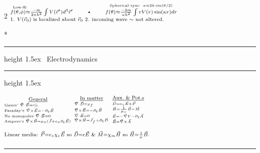 \documentclass{article}
\makeatletter
\def\HrulefillThick{\leavevmode\leaders\hrule height 1.5ex \hfill\kern\z@}
\newcommand{\YgorUD}[2]{\,\!^{#1}_{#2}}
\renewcommand{\section}[1]{%
     \@startsection{section}{1}{0mm}{0.01ex}{0.01ex}{%
         \normalfont\Large\bfseries\underline\centering }*{%
         \noindent\HrulefillThick%
              ~#1~\HrulefillThick}}
\makeatother
\begin{document}
\begin{multicols}{2}
$\YgorUD{%
        \overset{\text{Low-E:}}{%
        f ( \theta ,\phi ) \approx} \smash{\frac{-m}{2 \pi \hbar^{2}}}%
          \int   V ( \vec{r}' ) d^{ 3} \vec{r}'%
        \quad\quad\text{\textbullet}\quad\quad%
        \overset{\text{Spherical sym: }\, \kappa = 2k \sin ( \theta / 2 )}{%
        f ( \theta ) \approx\smash{\frac{- 2m}{\kappa \hbar^{2}}}%
          \int   r V ( r )  \sin ( \kappa r ) dr}%
    }{%
        \text{1. $V ( \vec{r}_{ 0} )$ is localized about $\vec{r}_{ 0}$ %
        2. incoming wave $\sim$ not altered.}%
    }$


\section{Electrodynamics}

$\overset{\text{\underline{General}}}{\YgorUD{
        \YgorUD{
            \text{Gauss' }%
            \vec{\nabla} \cdot \vec{E} = \sfrac{\rho}{\epsilon_{ \circ}}%
        }{%
            \text{Faraday's }%
            \vec{\nabla} \times \vec{E} = -\partial_{t}\vec{B}%
        }%
    }{%
        \YgorUD{
            \text{No monopoles }%
            \vec{\nabla} \cdot \vec{B} = 0%
        }{%
            \text{Ampere's }%
            \vec{\nabla} \times \vec{B} = \mu_{ \circ} ( \vec{J}  +  %
            \epsilon_{ \circ} \partial_{t} \vec{E} )%
        }%
    }}        $\hfill\textbullet\hfill%
    $\overset{\text{\underline{In matter}}}{\YgorUD{
        \YgorUD{
            \vec{\nabla} \cdot \vec{D} = \rho_{f}%
        }{%
            \vec{\nabla} \times \vec{E} = -\partial_{t}\vec{B}%
        }%
    }{%
        \YgorUD{
            \vec{\nabla} \cdot \vec{B} = 0%
        }{%
            \vec{\nabla} \times \vec{H} = \vec{J}_{f} + %
            \partial_{t}\vec{D}%
        }%
    }}    $\hfill\textbullet\hfill%
    $\overset{\text{\underline{Aux.\ \& Pot.s}}}{\YgorUD{
        \YgorUD{
            \vec{D} = \epsilon_{ \circ}\vec{E}+\vec{P}%
        }{%
            \vec{H} = \frac{1}{\mu_{ \circ}}\vec{B}-\vec{M}%
        }%
    }{%
        \YgorUD{
            \vec{E} = - \vec{\nabla} V -\partial_{t} \vec{A}%
        }{%
            \vec{B} = \vec{\nabla}\times\vec{A} %
        }%
    }}$

$\YgorUD{
        \text{Linear media: } \vec{P} = \epsilon_{ \circ} \chi_{ e}\vec{E}%
        \text{ so } \vec{D} = \epsilon \vec{E}%
        \,\,\text{\&}\,\,%
        \vec{M}=\chi_{ m}\vec{H}%
        \text{ so } \vec{H} = \frac{1}{\mu}\vec{B}.%
    }{%
        \,%
    }$
\hrule


\end{multicols}
\end{document}
